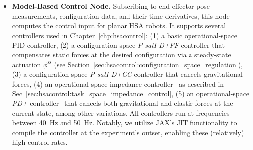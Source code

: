 \begin{itemize}
\begin{itemize}
        \item \textbf{Model-Based Control Node.} Subscribing to end-effector pose measurements, configuration data, and their time derivatives, this node computes the control input for planar \gls{HSA} robots. It supports several controllers used in Chapter~\ref{chp:hsacontrol}: (1) a basic operational-space PID controller, (2) a configuration-space \emph{P-satI-D+FF} controller that compensates static forces at the desired configuration via a steady-state actuation $\phi^\mathrm{ss}$ (see Section~\ref{sec:hsacontrol:configuration_space_regulation}), (3) a configuration-space \emph{P-satI-D+GC} controller that cancels gravitational forces, (4) an operational-space impedance controller~\citep{khatib1987unified} as described in Sec~\ref{sec:hsacontrol:task_space_impedance_control}, (5) an operational-space \emph{PD+} controller~\citep{paden1988globally, ott2008cartesian, della2020model} that cancels both gravitational and elastic forces at the current state, among other variations. All controllers run at frequencies between \SI{40}{Hz} and \SI{50}{Hz}. Notably, we utilize JAX’s \gls{JIT} functionality to compile the controller at the experiment’s outset, enabling these (relatively) high control rates.

\end{itemize}
\end{itemize}
